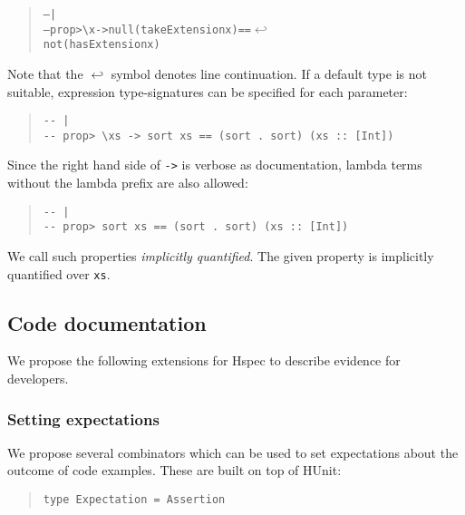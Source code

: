 \documentclass[preprint]{sigplanconf}
\begin{document}
\begin{quote}
\small
\begin{alltt}
-- |
-- prop> \verb|\|x -> null (takeExtension x) == \(\hookleftarrow\)
               not (hasExtension x)
\end{alltt}
\end{quote}

\noindent Note that the $\hookleftarrow$ symbol denotes line
continuation.
If a default type is not suitable, expression type-signatures can be
specified for each parameter:

\begin{quote}
\small
\begin{verbatim}
-- |
-- prop> \xs -> sort xs == (sort . sort) (xs :: [Int])
\end{verbatim}
\end{quote}

\noindent Since the right hand side of {\tt ->} is verbose as documentation,
lambda terms without the lambda prefix are also allowed:

\begin{quote}
\small
\begin{verbatim}
-- |
-- prop> sort xs == (sort . sort) (xs :: [Int])
\end{verbatim}
\end{quote}

\noindent We call such properties \emph{implicitly quantified}.  The
given property is implicitly quantified over \verb|xs|.

\subsection{Code documentation}
\label{sec:code-doc}

We propose the following extensions for Hspec to
describe evidence for developers.

\subsubsection{Setting expectations}

We propose several combinators which can be used to set expectations
about the outcome of code examples.  These are built on top of HUnit:

\begin{quote}
\small
\begin{verbatim}
type Expectation = Assertion
\end{verbatim}
\end{quote}
\end{document}
